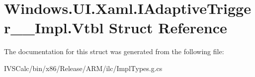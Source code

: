 \hypertarget{struct_windows_1_1_u_i_1_1_xaml_1_1_i_adaptive_trigger_____impl_1_1_vtbl}{}\section{Windows.\+U\+I.\+Xaml.\+I\+Adaptive\+Trigger\+\_\+\+\_\+\+Impl.\+Vtbl Struct Reference}
\label{struct_windows_1_1_u_i_1_1_xaml_1_1_i_adaptive_trigger_____impl_1_1_vtbl}


The documentation for this struct was generated from the following file\+:\begin{DoxyCompactItemize}
\item 
I\+V\+S\+Calc/bin/x86/\+Release/\+A\+R\+M/ilc/Impl\+Types.\+g.\+cs\end{DoxyCompactItemize}
